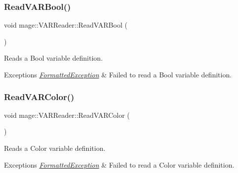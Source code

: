 \subsubsection{\texorpdfstring{Read\+V\+A\+R\+Bool()}{ReadVARBool()}}
{\footnotesize\ttfamily void mage\+::\+V\+A\+R\+Reader\+::\+Read\+V\+A\+R\+Bool (\begin{DoxyParamCaption}{ }\end{DoxyParamCaption})\hspace{0.3cm}{\ttfamily [private]}}

Reads a Bool variable definition.


\begin{DoxyExceptions}{Exceptions}
{\em \hyperlink{classmage_1_1_formatted_exception}{Formatted\+Exception}} & Failed to read a Bool variable definition. \\
\hline
\end{DoxyExceptions}
\hypertarget{classmage_1_1_v_a_r_reader_a7c36b7e10fa9daf7366ec4e84c11ca2a}{}\label{classmage_1_1_v_a_r_reader_a7c36b7e10fa9daf7366ec4e84c11ca2a} 
\subsubsection{\texorpdfstring{Read\+V\+A\+R\+Color()}{ReadVARColor()}}
{\footnotesize\ttfamily void mage\+::\+V\+A\+R\+Reader\+::\+Read\+V\+A\+R\+Color (\begin{DoxyParamCaption}{ }\end{DoxyParamCaption})\hspace{0.3cm}{\ttfamily [private]}}

Reads a Color variable definition.


\begin{DoxyExceptions}{Exceptions}
{\em \hyperlink{classmage_1_1_formatted_exception}{Formatted\+Exception}} & Failed to read a Color variable definition. \\
\hline
\end{DoxyExceptions}
\hypertarget{classmage_1_1_v_a_r_reader_a2d36a7cf1547cd795ee451c0219dd9f3}{}\label{classmage_1_1_v_a_r_reader_a2d36a7cf1547cd795ee451c0219dd9f3} 

